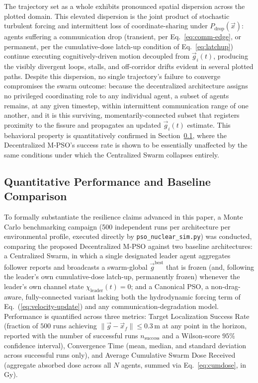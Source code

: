 \documentclass[journal]{IEEEtran}
\begin{document}
The trajectory set as a whole exhibits pronounced spatial dispersion across the plotted domain. This elevated dispersion is the joint product of stochastic turbulent forcing and intermittent loss of coordinate-sharing under $P_{\text{drop}}(\vec{x})$: agents suffering a communication drop (transient, per Eq.~\ref{eq:comm-edge}, or permanent, per the cumulative-dose latch-up condition of Eq.~\ref{eq:latchup}) continue executing cognitively-driven motion decoupled from $\vec{g}_i(t)$, producing the visibly divergent loops, stalls, and off-corridor drifts evident in several plotted paths. Despite this dispersion, no single trajectory's failure to converge compromises the swarm outcome: because the decentralized architecture assigns no privileged coordinating role to any individual agent, a subset of agents remains, at any given timestep, within intermittent communication range of one another, and it is this surviving, momentarily-connected subset that registers proximity to the fissure and propagates an updated $\vec{g}_i(t)$ estimate. This behavioral property is quantitatively confirmed in Section~\ref{sec:baseline}, where the Decentralized M-PSO's success rate is shown to be essentially unaffected by the same conditions under which the Centralized Swarm collapses entirely.

\subsection{Quantitative Performance and Baseline Comparison}
\label{sec:baseline}

To formally substantiate the resilience claims advanced in this paper, a Monte Carlo benchmarking campaign (500 independent runs per architecture per environmental profile, executed directly by \texttt{pso\_nuclear\_sim.py}) was conducted, comparing the proposed Decentralized M-PSO against two baseline architectures: a Centralized Swarm, in which a single designated leader agent aggregates follower reports and broadcasts a swarm-global $\vec{g}^{\text{best}}$ that is frozen (and, following the leader's own cumulative-dose latch-up, permanently frozen) whenever the leader's own channel state $\chi_{\text{leader}}(t)=0$; and a Canonical PSO, a non-drag-aware, fully-connected variant lacking both the hydrodynamic forcing term of Eq.~(\ref{eq:velocity-update}) and any communication-degradation model. Performance is quantified across three metrics: Target Localization Success Rate (fraction of $500$ runs achieving $\|\vec{g}-\vec{x}_f\| \le 0.3\,\text{m}$ at any point in the horizon, reported with the number of successful runs $n_{\text{success}}$ and a Wilson-score $95\%$ confidence interval), Convergence Time (mean, median, and standard deviation across successful runs only), and Average Cumulative Swarm Dose Received (aggregate absorbed dose across all $N$ agents, summed via Eq.~\ref{eq:cumdose}, in Gy).
\end{document}
